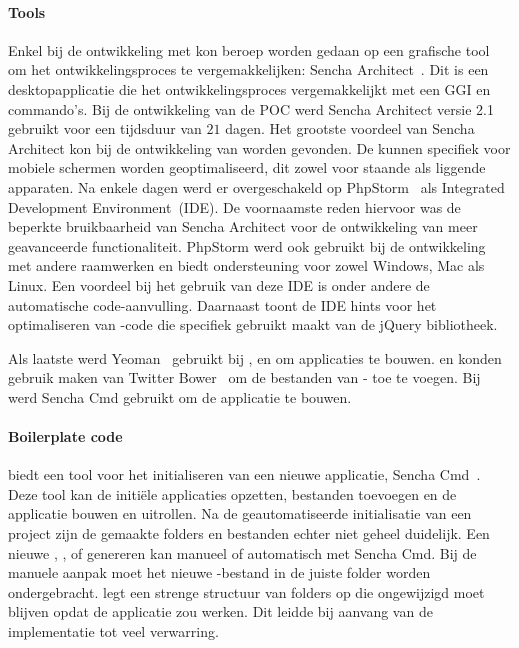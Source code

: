 \paragraph{Tools}
Enkel bij de ontwikkeling met \st{} kon beroep worden gedaan op een grafische tool om het ontwikkelingsproces te vergemakkelijken:  Sencha Architect~\cite{Sencha2012a}.
Dit is een desktopapplicatie die het ontwikkelingsproces vergemakkelijkt met een GGI en  commando's.  
Bij de ontwikkeling van de POC werd Sencha Architect versie 2.1 gebruikt voor een tijdsduur van $21$ dagen.
Het grootste voordeel van Sencha Architect kon bij de ontwikkeling van  worden gevonden.
De  kunnen specifiek voor mobiele schermen worden geoptimaliseerd, dit zowel voor staande als liggende apparaten.
Na enkele dagen werd er overgeschakeld op PhpStorm~\cite{JetBrains2012} als Integrated Development Environment~(IDE).
De voornaamste reden hiervoor was de beperkte bruikbaarheid van Sencha Architect voor de ontwikkeling van meer geavanceerde functionaliteit.
PhpStorm werd ook gebruikt bij de ontwikkeling met andere raamwerken en biedt ondersteuning voor zowel Windows, Mac als Linux.
Een voordeel bij het gebruik van deze IDE is onder andere de automatische code-aanvulling.
Daarnaast toont de IDE hints voor het optimaliseren van \js{}-code die specifiek gebruikt maakt van de jQuery bibliotheek.

Als laatste werd Yeoman~\cite{Yeoman2013} gebruikt bij \kendo{}, \jqm{} en \lungo{} om applicaties te bouwen.
\kendo{} en \lungo{} konden gebruik maken van Twitter Bower~\cite{Twitter2013} om de bestanden van \gh{}- toe te voegen.
Bij \st{} werd Sencha Cmd gebruikt om de applicatie te bouwen.

\paragraph{Boilerplate code}
\st{} biedt een tool voor het initialiseren van een nieuwe applicatie,  Sencha Cmd~\cite{Sencha2012}.
Deze tool kan de initiële applicaties opzetten,  bestanden toevoegen en de applicatie bouwen en uitrollen.
Na de geautomatiseerde initialisatie van een project zijn de gemaakte folders en bestanden echter niet geheel duidelijk.
Een nieuwe ,  ,   of  genereren kan manueel of automatisch met Sencha Cmd.
Bij de manuele aanpak moet het nieuwe \js-bestand in de juiste folder worden ondergebracht.
\st{} legt een strenge structuur van folders op die ongewijzigd moet blijven opdat de applicatie zou werken.
Dit leidde bij aanvang van de implementatie tot veel verwarring.

